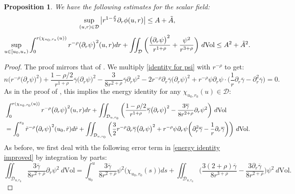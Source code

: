\documentclass[11pt]{article}
\newtheorem{proposition}{Proposition}[section]
\numberwithin{equation}{section}
\begin{document}
\begin{proposition}\label{improved scalar field proposition}
     We have the following estimates for the scalar field:
    \begin{equation}\label{improved rdrphi bound}
        \sup_{(u,r)\in\mathcal{D}}\big|r^{1-\frac{\rho}{2}}\partial_r\phi(u,r)\big|\leq A+\Tilde{A},
    \end{equation}
    \begin{equation}\label{improved energy estimate psi}
        \sup_{u\in[u_0,u_*)}\int_0^{r(\chi_{u_0,r_*}(u))}r^{-\rho}(\partial_r\psi\big)^2(u,r)dr+\iint_{\mathcal{D}}\bigg(\frac{\big(\partial_r\psi\big)^2}{r^{1+\rho}}+\frac{\psi^2}{r^{3+\rho}}\bigg)\ d\mathrm{Vol}\leq A^2+\Tilde{A}^2.
    \end{equation}
\end{proposition}
\begin{proof}
    The proof mirrors that of . We multiply \eqref{identity for psi} with $r^{-\rho}$ to get:
    \[n\Big(r^{-\rho}\big(\partial_r\psi\big)^2\Big)+\frac{1-\rho/2}{r^{1+\rho}}\overline{\gamma}\big(\partial_r\psi\big)^2-\frac{3}{8r^{2+\rho}}\overline{\gamma}\partial_r\psi^2-2r^{-\rho}\partial_r\overline{\gamma}\big(\partial_r\psi\big)^2+r^{-\rho}\psi\partial_r\psi\cdot\bigg(\frac{1}{r}\partial_r\overline{\gamma}-\partial_r^2\overline{\gamma}\bigg)=0.\]
    As in the proof of , this implies the energy identity for any $\chi_{u_0,r_0}(u)\in\mathcal{D}:$
    \begin{align}\label{energy identity improved}
        &\int_0^{r(\chi_{u_0,r_0}(u))}r^{-\rho}\big(\partial_r\psi\big)^2(u,r)dr+\iint_{\mathcal{D}_{u,r_0}}\bigg(\frac{1-\rho/2}{r^{1+\rho}}\overline{\gamma}\big(\partial_r\psi\big)^2-\frac{3\overline{\gamma}}{8r^{2+\rho}}\partial_r\psi^2\bigg)\ d\mathrm{Vol}\\
        &=\int_0^{r_0}\Tilde{r}^{-\rho}\big(\partial_r\psi\big)^2(u_0,\Tilde{r})d\Tilde{r}+\iint_{\mathcal{D}_{u,r_0}}\bigg(\frac{3}{2}r^{-\rho}\partial_r\overline{\gamma}\big(\partial_r\psi\big)^2+r^{-\rho}\psi\partial_r\psi\bigg(\partial_r^2\overline{\gamma}-\frac{1}{r}\partial_r\overline{\gamma}\bigg)\bigg)\ d\mathrm{Vol}.\notag
    \end{align}
    As before, we first deal with the following error term in \eqref{energy identity improved} by integration by parts:
    \[\iint_{\mathcal{D}_{u,r_0}}\frac{3\overline{\gamma}}{8r^{2+\rho}}\partial_r\psi^2\ d\mathrm{Vol}=\int_{u_0}^u\frac{3\overline{\gamma}}{8r^{2+\rho}}\psi^2\big(\chi_{u_0,r_0}(s)\big)ds+\iint_{\mathcal{D}_{u,r_0}}\bigg(\frac{3(2+\rho)\overline{\gamma}}{8r^{3+\rho}}-\frac{3\partial_r\overline{\gamma}}{8r^{2+\rho}}\bigg)\psi^2\ d\mathrm{Vol}.\]

\end{proof}
\end{document}
